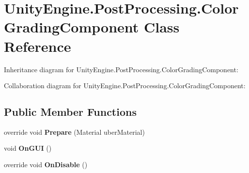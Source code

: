 \hypertarget{class_unity_engine_1_1_post_processing_1_1_color_grading_component}{}\section{Unity\+Engine.\+Post\+Processing.\+Color\+Grading\+Component Class Reference}
\label{class_unity_engine_1_1_post_processing_1_1_color_grading_component}


Inheritance diagram for Unity\+Engine.\+Post\+Processing.\+Color\+Grading\+Component\+:


Collaboration diagram for Unity\+Engine.\+Post\+Processing.\+Color\+Grading\+Component\+:
\subsection*{Public Member Functions}
\begin{DoxyCompactItemize}
\item 
\mbox{\label{class_unity_engine_1_1_post_processing_1_1_color_grading_component_a6028831311ad34f0f563fa5715c139dc}} 
override void {\bfseries Prepare} (Material uber\+Material)
\item 
\mbox{\label{class_unity_engine_1_1_post_processing_1_1_color_grading_component_abf942f421fab142504cd5be46b804815}} 
void {\bfseries On\+G\+UI} ()
\item 
\mbox{\label{class_unity_engine_1_1_post_processing_1_1_color_grading_component_a888398f3d7e4eeb2809dd9f66b185622}} 
override void {\bfseries On\+Disable} ()
\end{DoxyCompactItemize}
